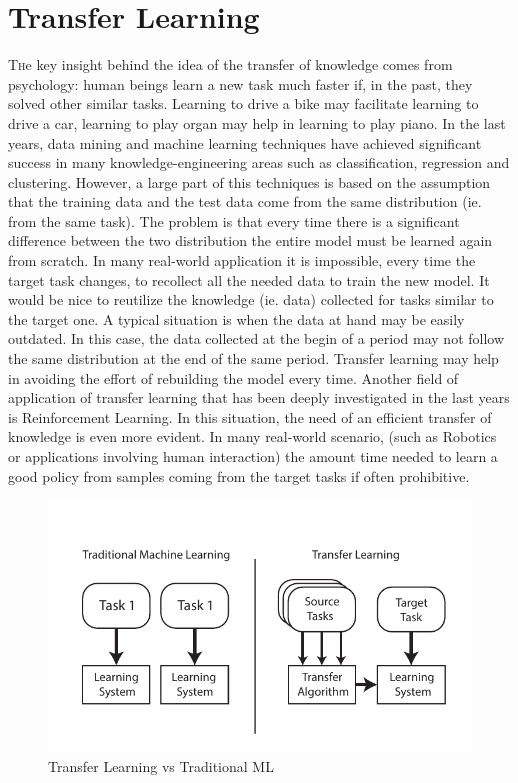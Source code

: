 \chapter{Transfer Learning}
  \lettrine[lines=2]{T}he key insight behind the idea of the transfer of knowledge comes from psychology: human beings
  learn a new task much faster if, in the past, they solved other similar tasks. Learning to drive
  a bike may facilitate learning to drive a car, learning to play organ may help in learning to play piano.\newline
  In the last years, data mining and machine learning techniques have achieved
  significant success in many knowledge-engineering areas such as classification, regression and clustering.\newline
  However, a large part of this techniques is based on the assumption that the training data
  and the test data come from the same distribution (ie. from the same task). The problem is that
  every time there is a significant difference between the two distribution the entire model
  must be learned again from scratch. In many real-world application it is impossible, every time the
  target task changes, to recollect all the needed data to train the new model. It would be nice
  to reutilize the knowledge (ie. data) collected for tasks similar to the target one.\newline
  A typical situation is when the data at hand may be easily outdated. In this case, the
  data collected at the begin of a period may not follow the same distribution at the end of the
  same period. Transfer learning may help in avoiding the effort of rebuilding the model every time.\newline
  Another field of application of transfer learning that has been deeply investigated in the last years is Reinforcement Learning.
  In this situation, the need of an efficient transfer of knowledge is even more evident. In many real-world scenario,
  (such as Robotics or applications involving human interaction) the amount time needed to learn a good policy from
  samples coming from the target tasks if often prohibitive.\newline

  \begin{figure}
    \centering
    \includegraphics{images/transfervsml.pdf}
    \caption{Transfer Learning vs Traditional ML}
    \label{fig:transfertraditional}
  \end{figure}

